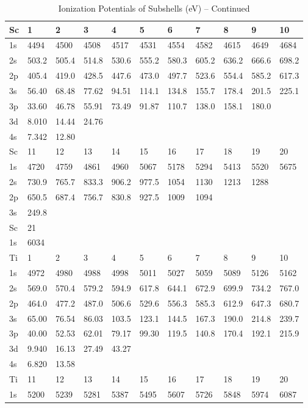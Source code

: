 \begin{table}
\begin{center}
\addtocounter{table}{-1}
\caption{Ionization Potentials of Subshells (eV) -- Continued}
\begin{tabular}{lllllllllll}
\hline
Sc&   1&   2&   3&   4&   5&   6&   7&   8&   9&  10\\
\hline
1s&  4494&  4500&  4508&  4517&  4531&
4554&  4582&  4615&  4649&  4684\\
2s& 503.2& 505.4& 514.8& 530.6& 555.2& 580.3& 605.2&
636.2& 666.6& 698.2\\
2p& 405.4& 419.0& 428.5& 447.6& 473.0& 497.7& 523.6& 554.4& 585.2&
617.3\\
3s& 56.40& 68.48& 77.62& 94.51& 114.1& 134.8& 155.7& 178.4& 201.5& 225.1\\
3p& 33.60&
46.78& 55.91& 73.49& 91.87& 110.7& 138.0& 158.1& 180.0\\
3d& 8.010& 14.44& 24.76\\
4s& 7.342&
12.80\\
\hline
Sc& 11& 12&  13&  14&  15&  16&  17&  18&  19&  20\\
\hline
1s&  4720&  4759&  4861&  4960&
5067&  5178&  5294&  5413&  5520&  5675\\
2s& 730.9& 765.7& 833.3& 906.2& 977.5& 1054&
1130& 1213& 1288\\
2p& 650.5& 687.4& 756.7& 830.8& 927.5&  1009&  1094\\
3s& 249.8\\
\hline
Sc&
21\\
\hline
1s&  6034\\
\hline
Ti&   1&   2&   3&   4&   5&   6&   7&   8&   9&  10\\
\hline
1s&  4972&  4980&  4988&
4998&  5011&  5027&  5059&  5089&  5126&  5162\\
2s& 569.0& 570.4& 579.2& 594.9& 617.8&
644.1& 672.9& 699.9& 734.2& 767.0\\
2p& 464.0& 477.2& 487.0& 506.6& 529.6& 556.3& 585.3&
612.9& 647.3& 680.7\\
3s& 65.00& 76.54& 86.03& 103.5& 123.1& 144.5& 167.3& 190.0& 214.8&
239.7\\
3p& 40.00& 52.53& 62.01& 79.17& 99.30& 119.5& 140.8& 170.4& 192.1& 215.9\\
3d&
9.940&
16.13& 27.49& 43.27\\
4s& 6.820& 13.58\\
\hline
Ti&  11&  12&  13&  14&  15&  16&  17&  18&  19&  20\\
\hline
1s&
5200&  5239&  5281&  5387&  5495&  5607&  5726&  5848&  5974&  6087\\

\end{tabular}
\end{center}
\end{table}
